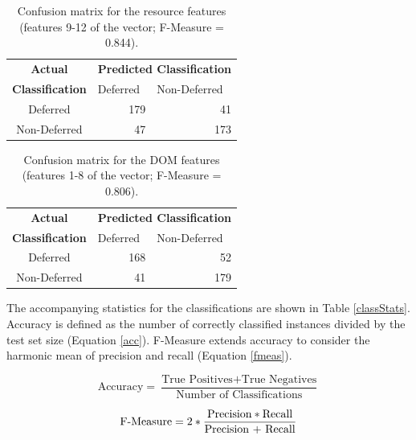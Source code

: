 \documentclass{ipres_proc_article-sp}
\begin{document}
\begin{table}
\centering\begin{tabular}{cll}
\textbf{Actual} & \multicolumn{2}{c}{ \textbf{Predicted Classification}}                           \\
\textbf{Classification}   &          Deferred       &           Non-Deferred             \\ \cline{2-3} 
       Deferred           & \multicolumn{1}{|r}{179} & \multicolumn{1}{|r|}{41} \\ \cline{2-3} 
       Non-Deferred       & \multicolumn{1}{|r}{47} & \multicolumn{1}{|r|}{173} \\ \cline{2-3} 
\end{tabular}
 \caption{Confusion matrix for the resource features (features 9-12 of the vector; F-Measure = 0.844).}
  \label{cmResource}
\end{table}

\begin{table}
\centering\begin{tabular}{cll}
\textbf{Actual} & \multicolumn{2}{c}{ \textbf{Predicted Classification}}                           \\
\textbf{Classification}   &          Deferred       &           Non-Deferred             \\ \cline{2-3} 
       Deferred           & \multicolumn{1}{|r}{168} & \multicolumn{1}{|r|}{52} \\ \cline{2-3} 
       Non-Deferred       & \multicolumn{1}{|r}{41} & \multicolumn{1}{|r|}{179} \\ \cline{2-3} 
\end{tabular}
 \caption{Confusion matrix for the DOM features (features 1-8 of the vector; F-Measure = 0.806).}
  \label{cmDOM}
\end{table}

The accompanying statistics for the classifications are shown in Table \ref{classStats}. Accuracy is defined as the number of correctly classified instances divided by the test set size (Equation \ref{acc}). F-Measure extends accuracy to consider the harmonic mean of precision and recall (Equation \ref{fmeas}). 

\begin{equation}
\label{acc}
\text{Accuracy} = \frac{\text{True Positives} + \text{True Negatives}}{\text{Number of Classifications}}
\end{equation}

\begin{equation}
\label{fmeas}
\text{F-Measure} = 2 * \frac{\text{Precision} * \text{Recall}}{\text{\text{Precision} + \text{Recall}}}
\end{equation}
\end{document}
